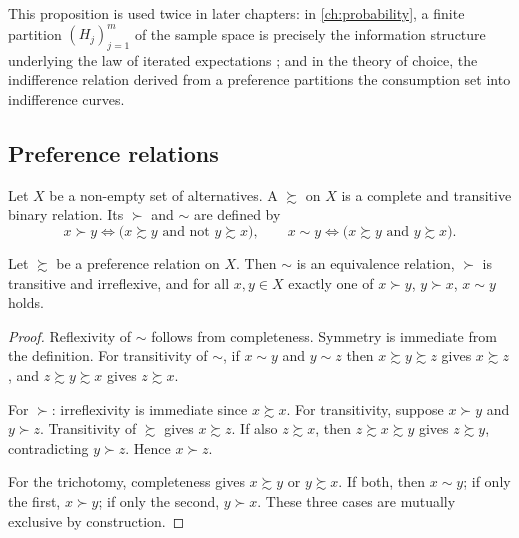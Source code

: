 This proposition is used twice in later chapters: in \autoref{ch:probability}, a
finite partition $(H_j)_{j=1}^m$ of the sample space is precisely the information
structure underlying the law of iterated expectations
\autocite[slide 18]{fukuda2026probability}; and in the theory of choice, the
indifference relation derived from a preference partitions the consumption set
into indifference curves.

\subsection{Preference relations}\label{subsec:preferences}

\begin{definition}\label{def:preference}
	Let $X$ be a non-empty set of alternatives. A 
	$\succsim$ on $X$ is a complete and transitive binary relation. Its
	 $\succ$ and  $\sim$ are defined by
	\[
		x\succ y \iff \bigl(x\succsim y \text{ and not } y\succsim x\bigr),
		\qquad
		x\sim y \iff \bigl(x\succsim y \text{ and } y\succsim x\bigr).
	\]
\end{definition}

\begin{proposition}\label{prop:preference-parts}
	Let $\succsim$ be a preference relation on $X$. Then $\sim$ is an equivalence
	relation, $\succ$ is transitive and irreflexive, and for all $x,y\in X$ exactly
	one of $x\succ y$, $y\succ x$, $x\sim y$ holds.
\end{proposition}

\begin{proof}
	Reflexivity of $\sim$ follows from completeness. Symmetry is immediate from the
	definition. For transitivity of $\sim$, if $x\sim y$ and $y\sim z$ then
	$x\succsim y\succsim z$ gives $x\succsim z$, and $z\succsim y\succsim x$ gives
	$z\succsim x$.

	For $\succ$: irreflexivity is immediate since $x\succsim x$. For transitivity,
	suppose $x\succ y$ and $y\succ z$. Transitivity of $\succsim$ gives
	$x\succsim z$. If also $z\succsim x$, then $z\succsim x\succsim y$ gives
	$z\succsim y$, contradicting $y\succ z$. Hence $x\succ z$.

	For the trichotomy, completeness gives $x\succsim y$ or $y\succsim x$. If both,
	then $x\sim y$; if only the first, $x\succ y$; if only the second, $y\succ x$.
	These three cases are mutually exclusive by construction.
\end{proof}

